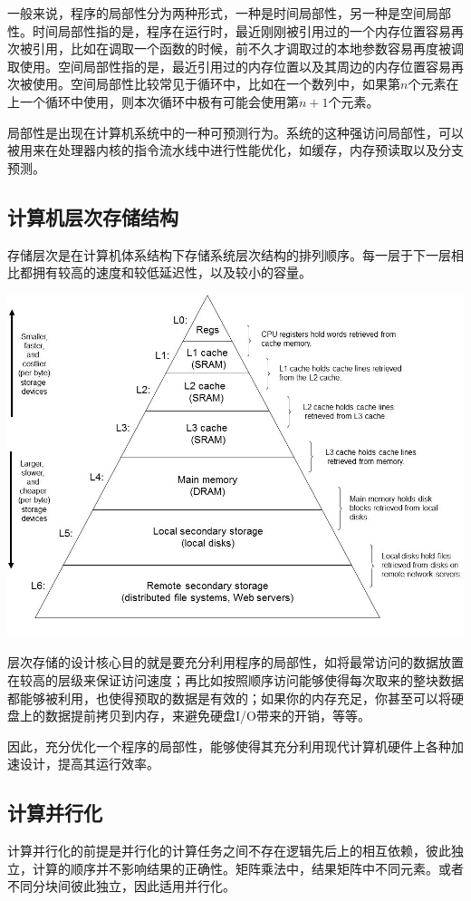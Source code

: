 \documentclass[UTF8,10pt]{ctexart}
\begin{document}
一般来说，程序的局部性分为两种形式，一种是时间局部性，另一种是空间局部性。时间局部性指的是，程序在运行时，最近刚刚被引用过的一个内存位置容易再次被引用，比如在调取一个函数的时候，前不久才调取过的本地参数容易再度被调取使用。空间局部性指的是，最近引用过的内存位置以及其周边的内存位置容易再次被使用。空间局部性比较常见于循环中，比如在一个数列中，如果第$n$个元素在上一个循环中使用，则本次循环中极有可能会使用第$n+1$个元素。

局部性是出现在计算机系统中的一种可预测行为。系统的这种强访问局部性，可以被用来在处理器内核的指令流水线中进行性能优化，如缓存，内存预读取以及分支预测。

\subsection{计算机层次存储结构}
存储层次是在计算机体系结构下存储系统层次结构的排列顺序。每一层于下一层相比都拥有较高的速度和较低延迟性，以及较小的容量。

\begin{center}
    \includegraphics[scale=0.42]{img/1.jpg}
\end{center}

层次存储的设计核心目的就是要充分利用程序的局部性，如将最常访问的数据放置在较高的层级来保证访问速度；再比如按照顺序访问能够使得每次取来的整块数据都能够被利用，也使得预取的数据是有效的；如果你的内存充足，你甚至可以将硬盘上的数据提前拷贝到内存，来避免硬盘I/O带来的开销，等等。

因此，充分优化一个程序的局部性，能够使得其充分利用现代计算机硬件上各种加速设计，提高其运行效率。

\subsection{计算并行化}
计算并行化的前提是并行化的计算任务之间不存在逻辑先后上的相互依赖，彼此独立，计算的顺序并不影响结果的正确性。矩阵乘法中，结果矩阵中不同元素。或者不同分块间彼此独立，因此适用并行化。
\end{document}
